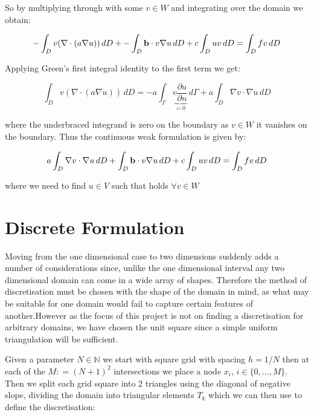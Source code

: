 So by multiplying through with some $v \in W$ and integrating over the domain
we obtain:

\begin{equation}
    -\int_{D}{v(\nabla\cdot(a\nabla{u}))}\,dD +
    -\int_{D}\mathbf{b}\cdot v\nabla{u}\,dD +
    c\int_{D}uv\,dD = \int_{D}fv\,dD
\end{equation}

Applying Green's first integral identity to the first term we get:

\begin{equation}
    \int_{D}v(\nabla\cdot(a\nabla u))\, dD =
    -a\int_{\Gamma}\underbrace{v\frac{\partial{u}}{\partial{n}}}_{ =0} \,d\Gamma
    + a\int_{D}\nabla{v}\cdot\nabla{u}\,dD
\end{equation}

where the underbraced integrand is zero on the boundary as $v \in W$ it
vanishes on the boundary. Thus the continuous weak formulation is given by:

\begin{equation}\label{eq:wk-twod-deterministic}
    a\int_{D}\nabla{v}\cdot\nabla{u}\,dD +
    \int_{D}\mathbf{b}\cdot v\nabla{u}\,dD + c\int_{D}uv\,dD =
    \int_{D}fv\,dD
\end{equation}

where we need to find $u \in V$ such that 
holds $\forall v \in W$

\section{Discrete Formulation}

Moving from the one dimensional case to two dimensions suddenly adds a number
of considerations since, unlike the one dimensional interval any two
dimensional domain can come in a wide array of shapes. Therefore the method of
discretisation must be chosen with the shape of the domain in mind, as what may
be suitable for one domain would fail to capture certain features of
another.However as the focus of this project is not on finding a discretisation
for arbitrary domains, we have chosen the unit square since a simple uniform
triangulation will be sufficient.

Given a parameter $N \in \mathbb{N}$ we start with square grid with spacing $h
= 1/N$ then at each of the $M: = (N+1)^2$ intersections we place a node $x_i$,
$i \in \{0,\ldots,M\}$. Then we split each grid square into 2 triangles
using the diagonal of negative slope, dividing the domain into triangular
elements $T_k$ which we can then use to define the discretisation:


